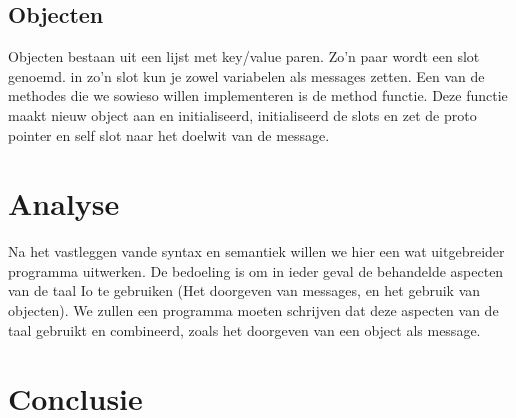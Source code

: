 \documentclass[12pt]{article}
\begin{document}
\subsection{Objecten}
Objecten bestaan uit een lijst met key/value paren. Zo'n paar wordt een slot genoemd.
in zo'n slot kun je zowel variabelen als messages zetten.
Een van de methodes die we sowieso willen implementeren is de method functie. 
Deze functie maakt nieuw object aan en initialiseerd, initialiseerd de slots en zet de proto pointer en self slot naar het doelwit van de message. 

\section{Analyse}
Na het vastleggen vande syntax en semantiek willen we hier een wat uitgebreider programma uitwerken. De bedoeling is om in ieder geval de behandelde aspecten van de taal Io te gebruiken (Het doorgeven van messages, en het gebruik van objecten). We zullen een programma moeten schrijven dat deze aspecten van de taal gebruikt en combineerd, zoals het doorgeven van een object als message.

\section{Conclusie}

\appendix
\end{document}
